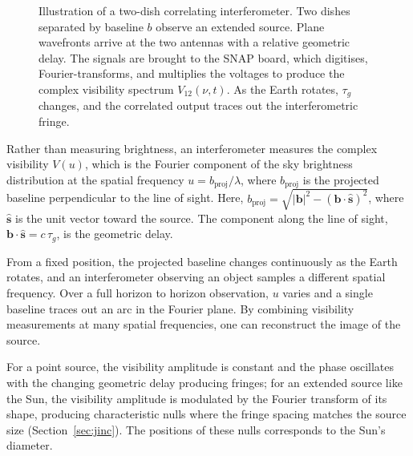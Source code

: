 \documentclass[10pt,preprint2]{aastex}
\begin{document}
\begin{figure}[t!]
\caption{Illustration of a two-dish correlating interferometer. Two dishes separated by baseline $b$ observe an extended source. Plane wavefronts arrive at the two antennas with a relative geometric delay. The signals are brought to the SNAP board, which digitises, Fourier-transforms, and multiplies the voltages to produce the complex visibility spectrum $V_{12}(\nu, t)$. As the Earth rotates, $\tau_g$ changes, and the correlated output traces out the interferometric fringe.}
\label{fig:interferometer}
\end{figure}

Rather than measuring brightness, an interferometer measures the complex visibility $V(u)$, which is the Fourier component of the sky brightness distribution at the spatial frequency $u = b_{\mathrm{proj}}/\lambda$, where $b_{\mathrm{proj}}$ is the projected baseline perpendicular to the line of sight. Here, $b_{\mathrm{proj}} = \sqrt{|\mathbf{b}|^2 - (\mathbf{b}\cdot\hat{\mathbf{s}})^2}$, where $\hat{\mathbf{s}}$ is the unit vector toward the source. The component along the line of sight, $\mathbf{b}\cdot\hat{\mathbf{s}} = c\,\tau_g$, is the geometric delay.

From a fixed position, the projected baseline changes continuously as the Earth rotates, and an interferometer observing an object samples a different spatial frequency. Over a full horizon to horizon observation, $u$ varies and a single baseline traces out an arc in the Fourier plane. By combining visibility measurements at many spatial frequencies, one can reconstruct the image of the source.

For a point source, the visibility amplitude is constant and the phase oscillates with the changing geometric delay producing fringes; for an extended source like the Sun, the visibility amplitude is modulated by the Fourier transform of its shape, producing characteristic nulls where the fringe spacing matches the source size (Section~\ref{sec:jinc}). The positions of these nulls corresponds to the Sun's diameter. 
\end{document}
